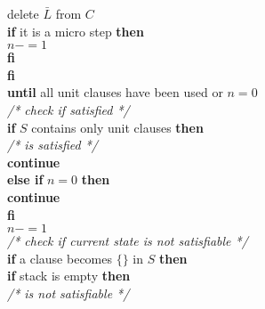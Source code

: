 \begin{listing}[h!]
                    \hspace*{2cm} delete $\bar{L}$ from $C$\\
                    \hspace*{2cm} \textbf{if} it is a micro step \textbf{then}\\
                        \hspace*{2.5cm} $n -= 1$\\
                    \hspace*{2cm} \textbf{fi}\\
                \hspace*{1.5cm} \textbf{fi}\\
            \hspace*{1.0cm} \textbf{until} all unit clauses have been used or $n = 0$\\
            \hspace*{1.0cm} \textit{/* check if satisfied */}\\
            \hspace*{1.0cm} \textbf{if} $S$ contains only unit clauses \textbf{then}\\
                \hspace*{1.5cm} \textit{/* is satisfied */}\\
                \hspace*{1.5cm} \textbf{continue}\\
            \hspace*{1.0cm} \textbf{else if} $n = 0$ \textbf{then}\\
                \hspace*{1.5cm} \textbf{continue}\\
            \hspace*{1.0cm} \textbf{fi}\\
            \hspace*{1.0cm} $n -= 1$\\
            \hspace*{1.0cm} \textit{/* check if current state is not satisfiable */}\\
            \hspace*{1.0cm} \textbf{if} a clause becomes $\{\}$ in $S$ \textbf{then}\\
                \hspace*{1.5cm} \textbf{if} stack is empty \textbf{then}\\
                    \hspace*{2cm} \textit{/* is not satisfiable */}\\

\end{listing}
